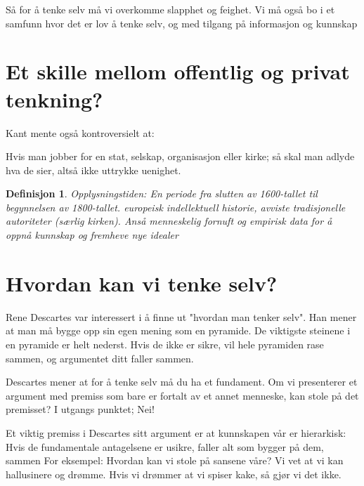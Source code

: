 \documentclass[11pt]{article}
\newtheorem{definition}{Definisjon}
\begin{document}
\vspace{1em}
Så for å tenke selv må vi overkomme slapphet og feighet. Vi må også bo i et samfunn hvor det er lov å tenke selv, og med tilgang på informasjon og kunnskap

\section{Et skille mellom offentlig og privat tenkning?}

Kant mente også kontroversielt at:

\vspace{1em}
Hvis man jobber for en stat, selskap, organisasjon eller kirke; så skal man adlyde hva de sier, altså ikke uttrykke uenighet.




\begin{definition}
    Opplysningstiden: En periode fra slutten av 1600-tallet til begynnelsen av 1800-tallet. europeisk indellektuell historie, avviste tradisjonelle autoriteter (særlig kirken). Anså menneskelig fornuft og empirisk data for å oppnå kunnskap og fremheve nye idealer
\end{definition}



\section{Hvordan kan vi tenke selv?}

Rene Descartes var interessert i å finne ut "hvordan man tenker selv". Han mener at man må bygge opp sin egen mening som en pyramide. De viktigste steinene i en pyramide er helt nederst. Hvis de ikke er sikre, vil hele pyramiden rase sammen, og argumentet ditt faller sammen.
\vspace{1em}

Descartes mener at for å tenke selv må du ha et fundament. Om vi presenterer et argument med premiss som bare er fortalt av  et annet menneske, kan stole på det premisset? I utgangs
punktet; Nei!
\vspace{1em}

Et viktig premiss i Descartes sitt argument er at kunnskapen vår er hierarkisk: Hvis de fundamentale antagelsene er usikre, faller alt som bygger på dem, sammen
\vspace{1em}
For eksempel: Hvordan kan vi stole på sansene våre? Vi vet at vi kan hallusinere og drømme. Hvis vi drømmer at vi spiser kake, så gjør vi det ikke. 
\end{document}
